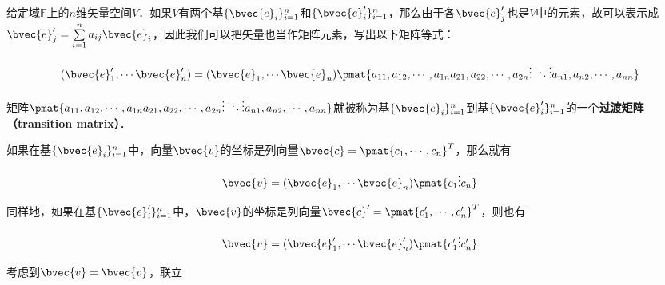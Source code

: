 
给定域$\mathbb{F}$上的$n$维矢量空间$V$．如果$V$有两个基$\{\bvec{e}_i\}_{i=1}^{n}$和$\{\bvec{e}'_i\}_{i=1}^{n}$，那么由于各$\bvec{e}'_j$也是$V$中的元素，故可以表示成$\bvec{e}'_j=\sum\limits_{i=1}^na_{ij}\bvec{e}_i$，因此我们可以把矢量也当作矩阵元素，写出以下矩阵等式：

\begin{equation}
(\bvec{e}'_1, \cdots\bvec{e}'_n)=(\bvec{e}_1, \cdots\bvec{e}_n)\pmat{a_{11},a_{12},\cdots,a_{1n}\newline a_{21},a_{22},\cdots,a_{2n}\newline\vdots\ddots\vdots\newline a_{n1},a_{n2},\cdots,a_{nn}}
\end{equation}

矩阵$\pmat{a_{11},a_{12},\cdots,a_{1n}\newline a_{21},a_{22},\cdots,a_{2n}\newline\vdots\ddots\vdots\newline a_{n1},a_{n2},\cdots,a_{nn}}$就被称为基$\{\bvec{e}_i\}_{i=1}^{n}$到基$\{\bvec{e}'_i\}_{i=1}^{n}$的一个\textbf{过渡矩阵（transition matrix）}．

如果在基$\{\bvec{e}_i\}_{i=1}^{n}$中，向量$\bvec{v}$的坐标是列向量$\bvec{c}=\pmat{c_1,\cdots, c_n}^T$，那么就有

\begin{equation}
\bvec{v}=(\bvec{e}_1, \cdots\bvec{e}_n)\pmat{c_1\newline\vdots\newline c_n}
\end{equation}

同样地，如果在基$\{\bvec{e}'_i\}_{i=1}^{n}$中，$\bvec{v}$的坐标是列向量$\bvec{c}'=\pmat{c'_1,\cdots, c'_n}^T$，则也有

\begin{equation}
\bvec{v}=(\bvec{e}'_1, \cdots\bvec{e}'_n)\pmat{c'_1\newline\vdots\newline c_n'}
\end{equation}

考虑到$\bvec{v}=\bvec{v}$，联立